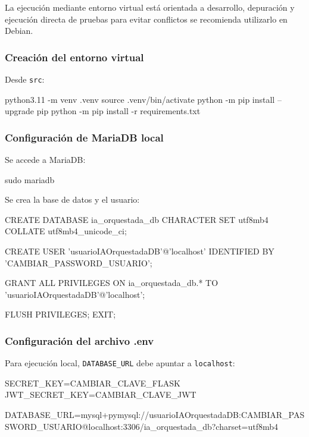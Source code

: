 La ejecución mediante entorno virtual está orientada a desarrollo, depuración y ejecución directa de pruebas para evitar conflictos se recomienda utilizarlo en Debian.

\subsubsection{Creación del entorno virtual}

Desde \texttt{src}:

\begin{bloqueTerminal}[title={Creación del entorno virtual}]
	python3.11 -m venv .venv
	source .venv/bin/activate
	python -m pip install --upgrade pip
	python -m pip install -r requirements.txt
\end{bloqueTerminal}

\subsubsection{Configuración de MariaDB local}

Se accede a MariaDB:

\begin{bloqueTerminal}[title={Acceso a MariaDB}]
	sudo mariadb
\end{bloqueTerminal}

Se crea la base de datos y el usuario:

\begin{bloqueCodigo}[title={Creación de base de datos y usuario}]
	CREATE DATABASE ia_orquestada_db
	CHARACTER SET utf8mb4
	COLLATE utf8mb4_unicode_ci;
	
	CREATE USER 'usuarioIAOrquestadaDB'@'localhost'
	IDENTIFIED BY 'CAMBIAR_PASSWORD_USUARIO';
	
	GRANT ALL PRIVILEGES ON ia_orquestada_db.*
	TO 'usuarioIAOrquestadaDB'@'localhost';
	
	FLUSH PRIVILEGES;
	EXIT;
\end{bloqueCodigo}

\subsubsection{Configuración del archivo .env}

Para ejecución local, \texttt{DATABASE\_URL} debe apuntar a \texttt{localhost}:

\begin{bloqueCodigo}[title={Ejemplo de configuración .env para entorno local}]
	SECRET_KEY=CAMBIAR_CLAVE_FLASK
	JWT_SECRET_KEY=CAMBIAR_CLAVE_JWT
	
	DATABASE_URL=mysql+pymysql://usuarioIAOrquestadaDB:CAMBIAR_PASSWORD_USUARIO@localhost:3306/ia_orquestada_db?charset=utf8mb4
\end{bloqueCodigo}

